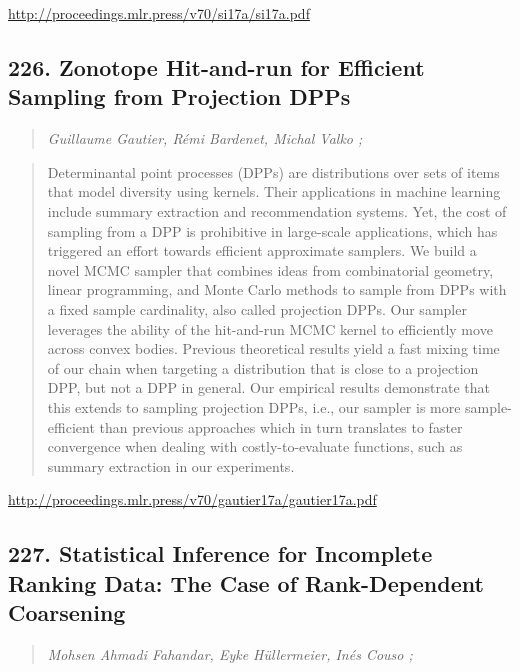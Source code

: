 \documentclass{article}
\begin{document}
\href{http://proceedings.mlr.press/v70/si17a/si17a.pdf}{http://proceedings.mlr.press/v70/si17a/si17a.pdf}

\subsection{226. Zonotope Hit-and-run for Efficient Sampling from Projection DPPs}

\begin{quote}
\footnotesize{\textit{Guillaume Gautier, Rémi Bardenet, Michal Valko ;}}

\end{quote}

\begin{quote}
    Determinantal point processes (DPPs) are distributions over sets of items that model diversity using kernels. Their applications in machine learning include summary extraction and recommendation systems. Yet, the cost of sampling from a DPP is prohibitive in large-scale applications, which has triggered an effort towards efficient approximate samplers. We build a novel MCMC sampler that combines ideas from combinatorial geometry, linear programming, and Monte Carlo methods to sample from DPPs with a fixed sample cardinality, also called projection DPPs. Our sampler leverages the ability of the hit-and-run MCMC kernel to efficiently move across convex bodies. Previous theoretical results yield a fast mixing time of our chain when targeting a distribution that is close to a projection DPP, but not a DPP in general. Our empirical results demonstrate that this extends to sampling projection DPPs, i.e., our sampler is more sample-efficient than previous approaches which in turn translates to faster convergence when dealing with costly-to-evaluate functions, such as summary extraction in our experiments.  
\end{quote}

\href{http://proceedings.mlr.press/v70/gautier17a/gautier17a.pdf}{http://proceedings.mlr.press/v70/gautier17a/gautier17a.pdf}

\subsection{227. Statistical Inference for Incomplete Ranking Data: The Case of Rank-Dependent Coarsening}

\begin{quote}
\footnotesize{\textit{Mohsen Ahmadi Fahandar, Eyke Hüllermeier, Inés Couso ;}}

\end{quote}
\end{document}
